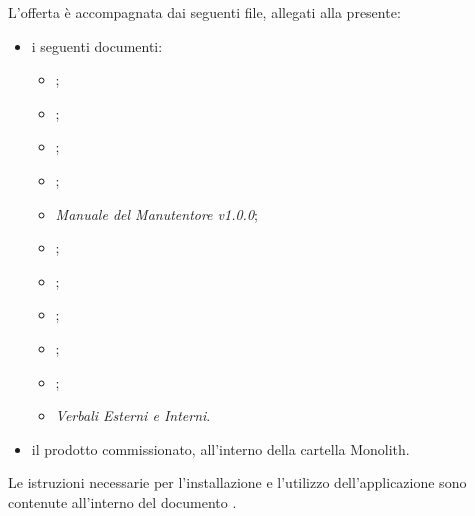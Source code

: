 \begin{titlepage}
\begin{large}
	L'offerta è accompagnata dai seguenti file, allegati alla presente: 
	\begin{itemize}
		\item i seguenti documenti:
		\begin{itemize}
			\item \AnalisiDeiRequisiti{};
			\item \DefinizioneDiProdotto{};
			\item \ManualeUtenteDemo{};
			\item \ManualeUtenteFramework{};
			\item \textit{Manuale del Manutentore v1.0.0};
			\item \Glossario{};
			\item \NormeDiProgetto{};
			\item \PianoDiProgetto{};
			\item \PianoDiQualifica{};
			\item \SpecificaTecnica{};
			\item \emph{Verbali Esterni e Interni}.
		\end{itemize}
		\item il prodotto commissionato, all'interno della cartella Monolith.
	\end{itemize}
	
	Le istruzioni necessarie per l'installazione e l'utilizzo dell'applicazione sono contenute all'interno del documento \ManualeUtenteDemo{}.\\
	\vspace{0.5cm}
	\end{large}
\end{titlepage}
